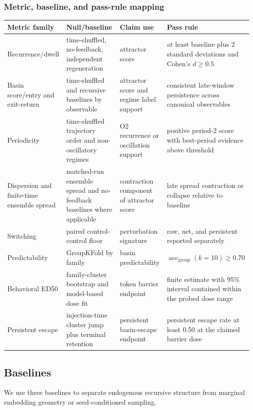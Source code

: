 \documentclass{article}
\theoremstyle{plain}
\theoremstyle{definition}
\begin{document}
\subsubsection*{Metric, baseline, and pass-rule mapping}

\begin{table}[h!]
\centering
\small
\begin{tabularx}{\textwidth}{lYYY}
\toprule
Metric family & Null/baseline & Claim use & Pass rule \\
\midrule
Recurrence/dwell & time-shuffled, no-feedback, independent regeneration & attractor score & at least baseline plus 2 standard deviations and Cohen's \(d\geq0.5\) \\
Basin score/entry and exit-return & time-shuffled and recursive baselines by observable & attractor score and regime label support & consistent late-window persistence across canonical observables \\
Periodicity & time-shuffled trajectory order and non-oscillatory regimes & O2 recurrence or oscillation support & positive period-2 score with best-period evidence above threshold \\
Dispersion and finite-time ensemble spread & matched-run ensemble spread and no-feedback baselines where applicable & contraction component of attractor score & late spread contraction or collapse relative to baseline \\
Switching & paired control-control floor & perturbation signature & raw, net, and persistent reported separately \\
Predictability & GroupKFold by family & basin predictability & \(\operatorname{acc}_{\mathrm{group}}(k=10)\geq0.70\) \\
Behavioral ED50 & family-cluster bootstrap and model-based dose fit & token barrier endpoint & finite estimate with 95\% interval contained within the probed dose range \\
Persistent escape & injection-time cluster jump plus terminal retention & persistent basin-escape endpoint & persistent escape rate at least 0.50 at the claimed barrier dose \\
\bottomrule
\end{tabularx}
\end{table}

\subsection{Baselines}

We use three baselines to separate endogenous recursive structure from marginal embedding geometry or seed-conditioned sampling.
\end{document}
